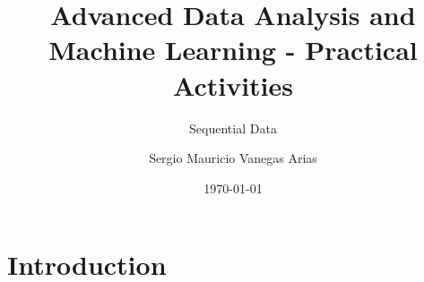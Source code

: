 \documentclass{scrartcl}
\title{Advanced Data Analysis and Machine Learning - Practical Activities}
\subtitle{Sequential Data}
\author{Sergio Mauricio Vanegas Arias}
\date{\today}
\begin{document}
\maketitle

\section{Introduction}
\end{document}
